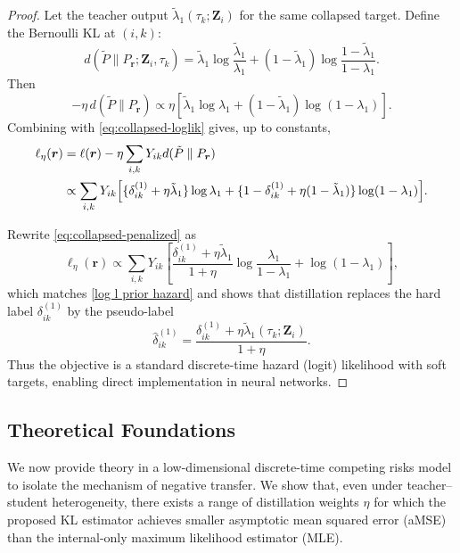 \documentclass{article}
\theoremstyle{plain}
\theoremstyle{definition}
\theoremstyle{remark}
\begin{document}
\begin{proof}

Let the teacher output $\tilde\lambda_1(\tau_k;\bm Z_i)$ for the same collapsed target.
Define the Bernoulli KL at $(i,k)$:
\[
d(\tilde P\parallel P_{\bm r};\bm Z_i,\tau_k)
=
\tilde\lambda_1\log\frac{\tilde\lambda_1}{\lambda_1}
+(1-\tilde\lambda_1)\log\frac{1-\tilde\lambda_1}{1-\lambda_1}.
\]
Then
\[
-\eta\,d(\tilde P\parallel P_{\bm r})
\propto
\eta\left[\tilde\lambda_1\log\lambda_1+(1-\tilde\lambda_1)\log(1-\lambda_1)\right].
\]
Combining with \eqref{eq:collapsed-loglik} gives, up to constants,
\begin{align}
\ell_\eta(\bm r)
&=
\ell(\bm r)-\eta\sum_{i,k}Y_{ik}d(\tilde P\parallel P_{\bm r})
\nonumber\\
&\propto
\sum_{i,k}Y_{ik}\Bigl[
\{\delta_{ik}^{(1)}+\eta\tilde\lambda_1\}\log\lambda_1
+\{1-\delta_{ik}^{(1)}+\eta(1-\tilde\lambda_1)\}\log(1-\lambda_1)
\Bigr].
\label{eq:collapsed-penalized}
\end{align}

Rewrite \eqref{eq:collapsed-penalized} as
\[
\ell_\eta(\bm r)
\propto
\sum_{i,k}Y_{ik}\left[
\frac{\delta_{ik}^{(1)}+\eta\tilde\lambda_1}{1+\eta}\log\frac{\lambda_1}{1-\lambda_1}
+\log(1-\lambda_1)
\right],
\]
which matches \eqref{log l prior hazard} and shows that distillation
replaces the hard label $\delta_{ik}^{(1)}$ by the pseudo-label
\[
\hat\delta_{ik}^{(1)}=\frac{\delta_{ik}^{(1)}+\eta\tilde\lambda_1(\tau_k;\bm Z_i)}{1+\eta}.
\]
Thus the objective is a standard discrete-time hazard (logit) likelihood
with soft targets, enabling direct implementation in neural networks.
\end{proof}


\subsection{Theoretical Foundations}
\label{app:prop6}

We now provide theory in a low-dimensional discrete-time competing risks model to isolate the mechanism of negative transfer.  
We show that, even under teacher–student heterogeneity, there exists a range of distillation weights $\eta$ for which the proposed KL estimator achieves smaller asymptotic mean squared error (aMSE)  than the internal-only maximum likelihood estimator (MLE).
\end{document}
